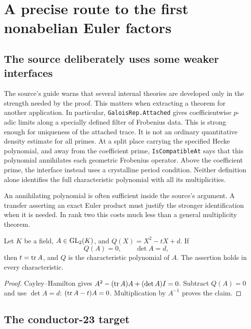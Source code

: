 \section{A precise route to the first nonabelian Euler factors}
\label{sec:euler}

\subsection{The source deliberately uses some weaker interfaces}

The source's guide warns that several internal theories are developed
only in the strength needed by the proof. This matters when extracting
a theorem for another application. In particular,
\texttt{GaloisRep.Attached} gives coefficientwise \(p\)-adic limits along
a specially defined filter of Frobenius data. This is strong enough
for uniqueness of the attached trace. It is not an ordinary
quantitative density estimate for all primes.
At a split place carrying the specified Hecke polynomial, and away
from the coefficient prime, \texttt{IsCompatibleAt} says that this
polynomial annihilates each geometric Frobenius operator. Above the
coefficient prime, the interface instead uses a crystalline period
condition. Neither definition alone identifies the full characteristic
polynomial with all its multiplicities.\cite{attached}

An annihilating polynomial is often sufficient inside the source's
argument. A transfer asserting an exact Euler product must justify the
stronger identification when it is needed. In rank two this costs
much less than a general multiplicity theorem.

\begin{lemma}
\label{lem:ranktwo}
Let \(K\) be a field, \(A\in\operatorname{GL}_2(K)\), and
\(Q(X)=X^2-tX+d\). If
\[
 Q(A)=0,\qquad \det A=d,
\]
then \(t=\operatorname{tr} A\), and \(Q\) is the characteristic polynomial of \(A\).
The assertion holds in every characteristic.
\end{lemma}
\begin{proof}
Cayley--Hamilton gives
\(A^2-(\operatorname{tr} A)A+(\det A)I=0\).
Subtract \(Q(A)=0\) and use \(\det A=d\):
\((\operatorname{tr} A-t)A=0\). Multiplication by \(A^{-1}\) proves the claim.
\end{proof}

\subsection{The conductor-23 target}

